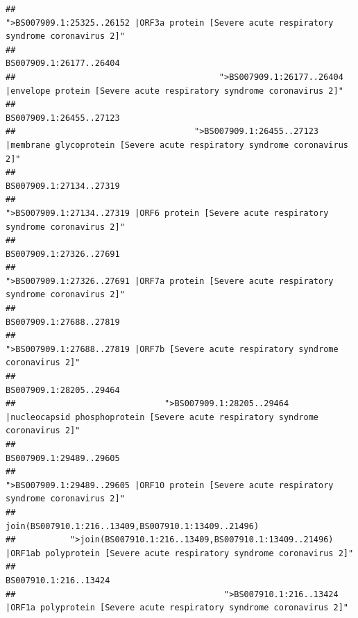 \documentclass[
]{article}
\begin{document}
\begin{verbatim}
##                                            ">BS007909.1:25325..26152 |ORF3a protein [Severe acute respiratory syndrome coronavirus 2]" 
##                                                                                                                BS007909.1:26177..26404 
##                                         ">BS007909.1:26177..26404 |envelope protein [Severe acute respiratory syndrome coronavirus 2]" 
##                                                                                                                BS007909.1:26455..27123 
##                                    ">BS007909.1:26455..27123 |membrane glycoprotein [Severe acute respiratory syndrome coronavirus 2]" 
##                                                                                                                BS007909.1:27134..27319 
##                                             ">BS007909.1:27134..27319 |ORF6 protein [Severe acute respiratory syndrome coronavirus 2]" 
##                                                                                                                BS007909.1:27326..27691 
##                                            ">BS007909.1:27326..27691 |ORF7a protein [Severe acute respiratory syndrome coronavirus 2]" 
##                                                                                                                BS007909.1:27688..27819 
##                                                    ">BS007909.1:27688..27819 |ORF7b [Severe acute respiratory syndrome coronavirus 2]" 
##                                                                                                                BS007909.1:28205..29464 
##                              ">BS007909.1:28205..29464 |nucleocapsid phosphoprotein [Severe acute respiratory syndrome coronavirus 2]" 
##                                                                                                                BS007909.1:29489..29605 
##                                            ">BS007909.1:29489..29605 |ORF10 protein [Severe acute respiratory syndrome coronavirus 2]" 
##                                                                                    join(BS007910.1:216..13409,BS007910.1:13409..21496) 
##           ">join(BS007910.1:216..13409,BS007910.1:13409..21496) |ORF1ab polyprotein [Severe acute respiratory syndrome coronavirus 2]" 
##                                                                                                                  BS007910.1:216..13424 
##                                          ">BS007910.1:216..13424 |ORF1a polyprotein [Severe acute respiratory syndrome coronavirus 2]" 

\end{verbatim}
\end{document}
